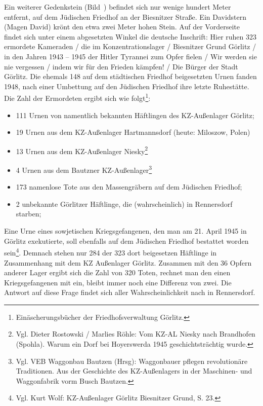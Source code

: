 Ein weiterer Gedenkstein (Bild~)\label{leichen} befindet sich nur wenige hundert Meter entfernt, auf dem Jüdischen Friedhof an der Biesnitzer Straße. Ein Davidstern (Magen David) krönt den etwa zwei Meter hohen Stein. Auf der Vorderseite findet sich unter einem abgesetzten Winkel die deutsche Inschrift: \glqq Hier ruhen 323 ermordete Kameraden / die im Konzentrationslager / Biesnitzer Grund Görlitz / in den Jahren 1943 -- 1945
der Hitler Tyrannei zum Opfer fielen / Wir werden sie nie vergessen / indem wir für den Frieden kämpfen! / Die Bürger der Stadt Görlitz\grqq.%
\newline
Die ehemals 148 auf dem städtischen Friedhof beigesetzten Urnen fanden 1948, nach einer Umbettung auf den Jüdischen Friedhof ihre letzte Ruhestätte.  Die Zahl der Ermordeten ergibt sich wie folgt\footnote{Einäscherungsbücher der Friedhofsverwaltung Görlitz.}:
\begin{itemize}
\item 111 Urnen von namentlich bekannten Häftlingen des KZ-Außenlager Görlitz; 
\item 19 Urnen aus dem KZ-Außenlager Hartmannsdorf (heute: Miloszow, Polen)
\item 13 Urnen aus dem KZ-Außenlager Niesky\footnote{Vgl. Dieter Rostowski / Marlies Röhle: Vom KZ-AL Niesky nach Brandhofen (Spohla). Warum ein Dorf bei Hoyerswerda 1945 geschichtsträchtig wurde.}
\item 4 Urnen aus dem Bautzner KZ-Außenlager\footnote{Vgl. VEB Waggonbau Bautzen (Hrsg): Wag­gon­bauer pfle­gen re­vo­lu­tio­näre Tra­di­tio­nen. Aus der Ge­schichte des KZ-Außenlagers in der Maschinen- und Wag­gon­fa­brik vorm Busch Baut­zen.}
\item 173 namenlose Tote aus den Massengräbern auf dem Jüdischen Friedhof;
\item 2 unbekannte Görlitzer Häftlinge, die (wahrscheinlich) in Rennersdorf starben;
\end{itemize}
Eine Urne eines sowjetischen Kriegsgefangenen, den man am 21. April 1945 in Görlitz exekutierte, soll ebenfalls auf dem Jüdischen Friedhof bestattet worden sein\footnote{Vgl. Kurt Wolf: KZ-Außenlager Görlitz Biesnitzer Grund, S. 23.}. 
Demnach stehen nur 284 der 323 dort beigesetzen Häftlinge in Zusammenhang mit dem KZ Außenlager Görlitz. Zusammen mit den 36 Opfern anderer Lager ergibt sich die Zahl von 320 Toten, rechnet man den einen Kriegsgefangenen mit ein, bleibt immer noch eine Differenz von zwei. Die Antwort auf diese Frage findet sich aller Wahrscheinlichkeit nach in Rennersdorf.

